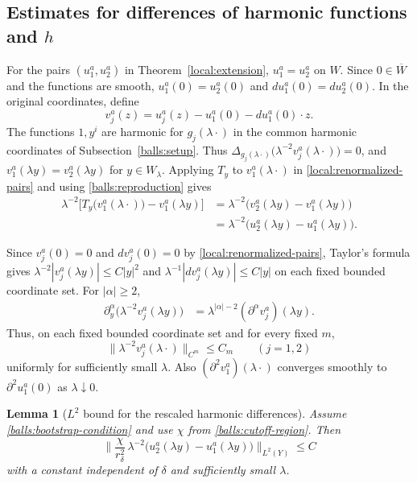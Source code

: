 \documentclass[11pt,a4paper]{article}
\newtheorem{lemma}[theorem]{Lemma}
\theoremstyle{definition}
\theoremstyle{remark}
\numberwithin{equation}{section}
\begin{document}
\subsection{Estimates for differences of harmonic functions and \texorpdfstring{$h$}{h}}

For the pairs $(u_1^a,u_2^a)$ in Theorem~\ref{local:extension},
$u_1^a=u_2^a$ on $W$. Since $0\in\overline W$ and the functions
are smooth, $u_1^a(0)=u_2^a(0)$ and $du_1^a(0)=du_2^a(0)$.
In the original coordinates, define
\begin{equation}\label{local:renormalized-pairs}
 v_j^a(z)=u_j^a(z)-u_1^a(0)-du_1^a(0)\cdot z.
\end{equation}
The functions $1,y^i$ are harmonic for $g_j(\lambda\cdot)$ in
the common harmonic coordinates of Subsection~\ref{balls:setup}.
Thus
$\Delta_{g_j(\lambda\cdot)}\bigl(\lambda^{-2}v_j^a(\lambda\cdot)\bigr)=0$,
and $v_1^a(\lambda y)=v_2^a(\lambda y)$ for $y\in W_\lambda$.
Applying $T_y$ to $v_1^a(\lambda\cdot)$ in
\eqref{local:renormalized-pairs} and using \eqref{balls:reproduction} gives
\begin{align*}
 \lambda^{-2}\bigl[T_y\bigl(v_1^a(\lambda\cdot)\bigr)-v_1^a(\lambda y)\bigr]
 &=\lambda^{-2}\bigl(v_2^a(\lambda y)-v_1^a(\lambda y)\bigr)\\
 &=\lambda^{-2}\bigl(u_2^a(\lambda y)-u_1^a(\lambda y)\bigr).
\end{align*}

Since $v_j^a(0)=0$ and $dv_j^a(0)=0$ by
\eqref{local:renormalized-pairs}, Taylor's formula gives
$\lambda^{-2}|v_j^a(\lambda y)|\le C|y|^2$ and
$\lambda^{-1}|dv_j^a(\lambda y)|\le C|y|$ on each fixed bounded
coordinate set. For $|\alpha|\ge2$,
\begin{align*}
 \partial_y^\alpha\bigl(\lambda^{-2}v_j^a(\lambda y)\bigr)
 &=\lambda^{|\alpha|-2}(\partial^\alpha v_j^a)(\lambda y).
\end{align*}
Thus, on each fixed bounded coordinate set and for every fixed $m$,
\begin{equation}\label{local:uniform-Cm-bound}
 \bigl\|\lambda^{-2}v_j^a(\lambda\cdot)\bigr\|_{C^m}\le C_m
 \qquad(j=1,2)
\end{equation}
uniformly for sufficiently small $\lambda$.
Also $(\partial^2v_1^a)(\lambda\cdot)$ converges smoothly to
$\partial^2u_1^a(0)$ as $\lambda\downarrow0$.

\begin{lemma}[$L^2$ bound for the rescaled harmonic differences]\label{local:moment}
Assume \eqref{balls:bootstrap-condition} and use $\chi$ from
\eqref{balls:cutoff-region}. Then
\begin{equation}\label{local:moment-bound}
 \biggl\|\frac{\chi}{r_\delta^2}\,
   \lambda^{-2}\bigl(u_2^a(\lambda y)-u_1^a(\lambda y)\bigr)
 \biggr\|_{L^2(Y)}\leq C
\end{equation}
with a constant independent of $\delta$ and sufficiently small $\lambda$.
\end{lemma}
\end{document}
